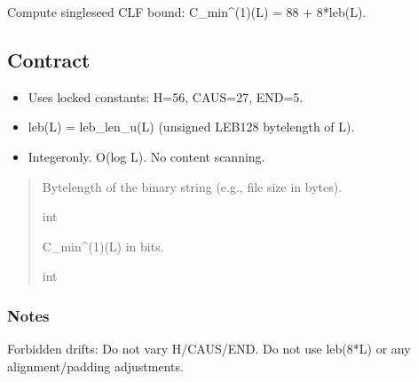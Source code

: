 \documentclass[letterpaper,10pt,english]{sphinxmanual}
\begin{document}
\begin{fulllineitems}
\label{\detokenize{clf_maximal_validator:CLF_MAXIMAL_VALIDATOR_FINAL.clf_single_seed_cost}}
\pysigstartsignatures
\pysiglinewithargsret
{}
{}
{}
\pysigstopsignatures
\sphinxAtStartPar
Compute single\sphinxhyphen{}seed CLF bound: C\_min\textasciicircum{}(1)(L) = 88 + 8*leb(L).


\subsection{Contract}
\label{\detokenize{clf_maximal_validator:id1}}\begin{itemize}
\item {} 
\sphinxAtStartPar
Uses locked constants: H=56, CAUS=27, END=5.

\item {} 
\sphinxAtStartPar
leb(L) = leb\_len\_u(L) (unsigned LEB128 byte\sphinxhyphen{}length of L).

\item {} 
\sphinxAtStartPar
Integer\sphinxhyphen{}only. O(log L). No content scanning.

\end{itemize}
\begin{quote}\begin{description}
\sphinxAtStartPar
{}

\sphinxAtStartPar
Byte\sphinxhyphen{}length of the binary string (e.g., file size in bytes).

\sphinxAtStartPar
int

\sphinxAtStartPar
C\_min\textasciicircum{}(1)(L) in bits.

\sphinxAtStartPar
int

\end{description}\end{quote}
\subsubsection*{Notes}

\sphinxAtStartPar
Forbidden drifts:
\sphinxhyphen{} Do not vary H/CAUS/END.
\sphinxhyphen{} Do not use leb(8*L) or any alignment/padding adjustments.

\end{fulllineitems}
\end{document}
